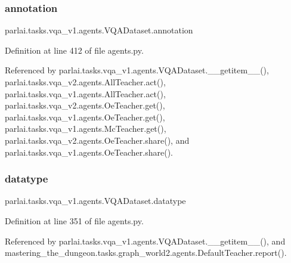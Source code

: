 \subsubsection{\texorpdfstring{annotation}{annotation}}
{\footnotesize\ttfamily parlai.\+tasks.\+vqa\+\_\+v1.\+agents.\+V\+Q\+A\+Dataset.\+annotation}



Definition at line 412 of file agents.\+py.



Referenced by parlai.\+tasks.\+vqa\+\_\+v1.\+agents.\+V\+Q\+A\+Dataset.\+\_\+\+\_\+getitem\+\_\+\+\_\+(), parlai.\+tasks.\+vqa\+\_\+v2.\+agents.\+All\+Teacher.\+act(), parlai.\+tasks.\+vqa\+\_\+v1.\+agents.\+All\+Teacher.\+act(), parlai.\+tasks.\+vqa\+\_\+v2.\+agents.\+Oe\+Teacher.\+get(), parlai.\+tasks.\+vqa\+\_\+v1.\+agents.\+Oe\+Teacher.\+get(), parlai.\+tasks.\+vqa\+\_\+v1.\+agents.\+Mc\+Teacher.\+get(), parlai.\+tasks.\+vqa\+\_\+v2.\+agents.\+Oe\+Teacher.\+share(), and parlai.\+tasks.\+vqa\+\_\+v1.\+agents.\+Oe\+Teacher.\+share().

\mbox{\label{classparlai_1_1tasks_1_1vqa__v1_1_1agents_1_1VQADataset_ae0d953b70e4f0b495a557a2255ebd6a9}} 
\subsubsection{\texorpdfstring{datatype}{datatype}}
{\footnotesize\ttfamily parlai.\+tasks.\+vqa\+\_\+v1.\+agents.\+V\+Q\+A\+Dataset.\+datatype}



Definition at line 351 of file agents.\+py.



Referenced by parlai.\+tasks.\+vqa\+\_\+v1.\+agents.\+V\+Q\+A\+Dataset.\+\_\+\+\_\+getitem\+\_\+\+\_\+(), and mastering\+\_\+the\+\_\+dungeon.\+tasks.\+graph\+\_\+world2.\+agents.\+Default\+Teacher.\+report().

\mbox{\label{classparlai_1_1tasks_1_1vqa__v1_1_1agents_1_1VQADataset_a2f406d1ee283616a5869937aaea1abe0}} 
